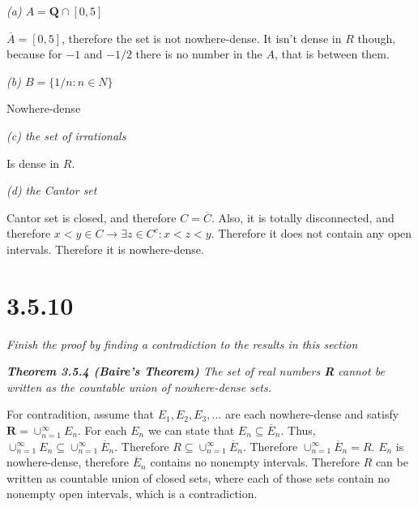 \documentclass[11pt,oneside,titlepage]{article}
\begin{document}
\textit{(a) $A = \textbf{Q} \cap [0, 5]$}

$\overline A = [0, 5]$, therefore the set is not nowhere-dense. It isn't
dense in $R$ though, because for $-1$ and $-1/2$ there is no number in the
$A$, that is between them.

\textit{(b) $B = \{1/n: n \in N\}$}

Nowhere-dense

\textit{(c) the set of irrationals}

Is dense in $R$.

\textit{(d) the Cantor set}

Cantor set is closed, and therefore $C = \overline C$. Also, it is totally
disconnected, and therefore $x < y \in C \to \exists z \in C^c: x < z < y$.
Therefore it does not contain any open intervals. Therefore it
is nowhere-dense.

\section*{3.5.10}
\textit{Finish the proof by finding a contradiction to the results in this
  section}

\textit{\textbf{Theorem 3.5.4 (Baire's Theorem)} The set of real numbers
  \textbf{R} cannot be written as the countable union of nowhere-dense sets.}

For contradition, assume that $E_1, E_2, E_3, ... $ are each nowhere-dense and
satisfy $\textbf{R} = \cup_{n = 1}^{\infty} E_n$. For each $E_n$ we can state
that $E_n \subseteq \overline E_n$. Thus, $\cup_{n = 1}^{\infty} E_n \subseteq
\cup_{n = 1}^{\infty} \overline E_n$. Therefore
$R \subseteq \cup_{n = 1}^{\infty} \overline E_n$. Therefore
$\cup_{n = 1}^{\infty} \overline E_n = R$. $E_n$ is nowhere-dense, therefore
$\overline E_n$ contains no nonempty intervals. Therefore $R$ can be written as
countable union of closed sets, where each of those sets contain no nonempty
open intervals, which is a contradiction.
\end{document}
